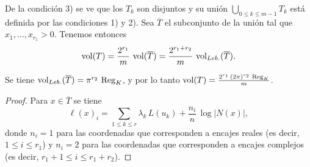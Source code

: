 De la condición 3) se ve que los $T_k$ son disjuntos y su unión
$\bigcup_{0 \le k \le m-1} T_k$ está definida por las condiciones 1) y 2).
Sea $\overline{T}$ el subconjunto de la unión tal que $x_1,\ldots,x_{r_1} > 0$.
Tenemos entonces
\[ \operatorname{vol} (T) = \frac{2^{r_1}}{m}\,\operatorname{vol} (\overline{T}) =
\frac{2^{r_1+r_2}}{m} \, \operatorname{vol}_{Leb.} (\overline{T}). \]

\begin{proposicion}
  Se tiene $\operatorname{vol}_{Leb.} (\overline{T}) = \pi^{r_2}\,\operatorname{Reg}_K$, y por lo tanto
  $\operatorname{vol} (T) = \frac{2^{r_1}\,(2\pi)^{r_2}\,\operatorname{Reg}_K}{m}$.

  \begin{proof}
    Para $x \in \overline{T}$ se tiene
    \[ \ell (x)_i =\sum_{1 \le k \le r} \lambda_k\,L (u_k) +
    \frac{n_i}{n}\,\log |N (x)|, \]
    donde $n_i = 1$ para las coordenadas que corresponden a encajes reales
    (es decir, $1 \le i \le r_1$)
    y $n_i = 2$ para las coordenadas que corresponden a encajes complejos
    (es decir, $r_1 + 1 \le i \le r_1 + r_2$).


\end{proof}
\end{proposicion}
